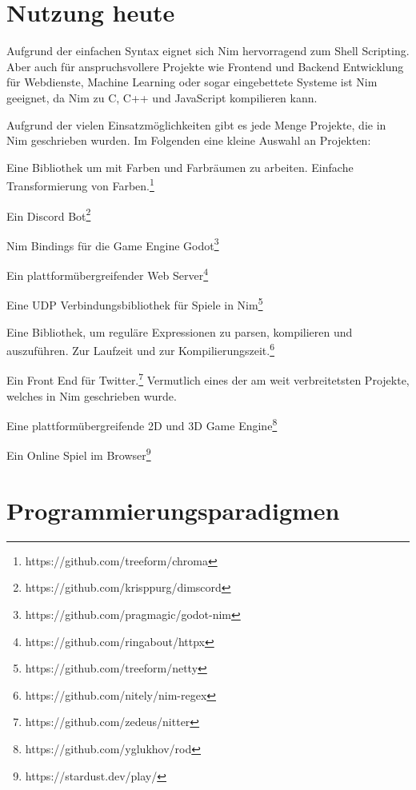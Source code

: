 \documentclass[11pt]{report}
\begin{document}
\section{Nutzung heute}
Aufgrund der einfachen Syntax eignet sich Nim hervorragend zum Shell Scripting.
Aber auch für anspruchsvollere Projekte wie Frontend und Backend Entwicklung für Webdienste, Machine Learning oder sogar eingebettete Systeme ist Nim geeignet, da Nim zu C, C++ und JavaScript kompilieren kann.

Aufgrund der vielen Einsatzmöglichkeiten gibt es jede Menge Projekte, die in Nim geschrieben wurden. Im Folgenden eine kleine Auswahl an Projekten:
\begin{description}
\addtolength{\itemindent}{0.60cm}
\item[Chroma] Eine Bibliothek um mit Farben und Farbräumen zu arbeiten. Einfache Transformierung von Farben.\footnote{https://github.com/treeform/chroma}
\item[dimscord] Ein Discord Bot\footnote{https://github.com/krisppurg/dimscord}
\item[godot-nim] Nim Bindings für die Game Engine Godot\footnote{https://github.com/pragmagic/godot-nim}
\item[httpx] Ein plattformübergreifender Web Server\footnote{https://github.com/ringabout/httpx}
\item[netty] Eine UDP Verbindungsbibliothek für Spiele in Nim\footnote{https://github.com/treeform/netty}
\item[nim-regex] Eine Bibliothek, um reguläre Expressionen zu parsen, kompilieren und auszuführen. Zur Laufzeit und zur Kompilierungszeit.\footnote{https://github.com/nitely/nim-regex}
\item[nitter] Ein Front End für Twitter.\footnote{https://github.com/zedeus/nitter} Vermutlich eines der am weit verbreitetsten Projekte, welches in Nim geschrieben wurde.
\item[rod] Eine plattformübergreifende 2D und 3D Game Engine\footnote{https://github.com/yglukhov/rod}
\item[Stardust] Ein Online Spiel im Browser\footnote{https://stardust.dev/play/}
\end{description}


\section{Programmierungsparadigmen}
\end{document}
